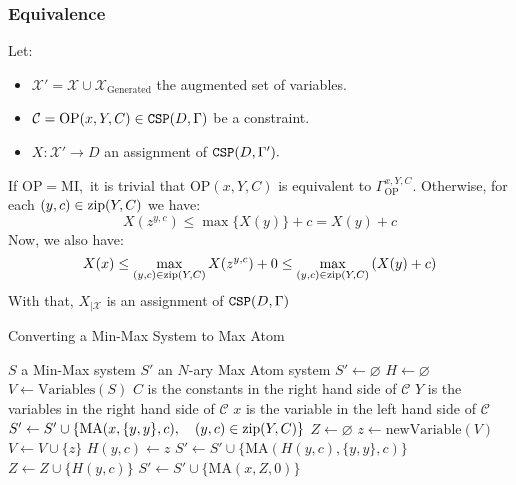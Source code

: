 \subsubsection{Equivalence}
Let:
\begin{itemize}
	\item $\mathcal{X}' = \mathcal{X}\cup \mathcal{X}_{\text{Generated}}$ the augmented set of variables.
	\item $\mathcal{C}=\text{OP}(x,Y,C)\in \operatorname{\mathtt{CSP}}(D,\Gamma)$ be a constraint.
	\item $X:\mathcal{X'}\rightarrow D$ an assignment of $\operatorname{\mathtt{CSP}}(D,\Gamma').$
\end{itemize}
If $\text{OP}=\text{MI},$ it is trivial that $\text{OP}(x,Y,C)$ is equivalent to $\Gamma^{x,Y,C}_{\text{OP}}.$
\newline Otherwise, for each $(y,c)\in \operatorname{zip}(Y,C)$ we have:
$$
X(z^{y,c}) \le \max\{X(y)\}+c = X(y)+c
$$
Now, we also have:
$$
X(x) \le \max_{(y,c)\in\operatorname{zip}(Y,C)}X(z^{y,c}) +0 \le \max_{(y,c)\in \operatorname{zip}(Y,C)}\left(X(y)+c\right)
$$
With that, $X_{\mid \mathcal{X}}$ is an assignment of $\operatorname{\mathtt{CSP}}(D,\Gamma)$
\begin{algorithm}
	\caption{Converting a Min-Max System to Max Atom}\label{alg:MinMaxToMaxAtom}
	\begin{algorithmic}
		\Require $S$ a Min-Max system
		\Ensure $S'$ an $N$-ary Max Atom system  
		\State $S'\leftarrow \varnothing$
		\State $H\leftarrow\varnothing$ 
		\State $V\leftarrow \text{Variables}(S)$  
		 \State $C$ is the constants in the right hand side of $\mathcal{C}$
		 \State $Y$ is the variables in the right hand side of $\mathcal{C}$
		 \State $x$ is the variable in the left hand side of $\mathcal{C}$
			\State $S'\leftarrow S'\cup\left\{\text{MA}(x,\{y,y\},c),\quad (y,c)\in \operatorname{zip}(Y,C)\right\}$
		\Else
			\State $Z\leftarrow \varnothing$
					\State $z\leftarrow \text{newVariable}(V)$ 
					\State $V\leftarrow V\cup\{z\}$
					\State $H(y,c)\leftarrow z$
				\EndIf
				\State $S'\leftarrow S'\cup\{\text{MA}(H(y,c),\{y,y\},c)\}$
				\State $Z\leftarrow Z\cup \{H(y,c)\} $
			\EndFor
			\State $S' \leftarrow S' \cup \{\text{MA}(x,Z,0)\}$
		\EndIf
		\EndFor
	\end{algorithmic}
\end{algorithm}


